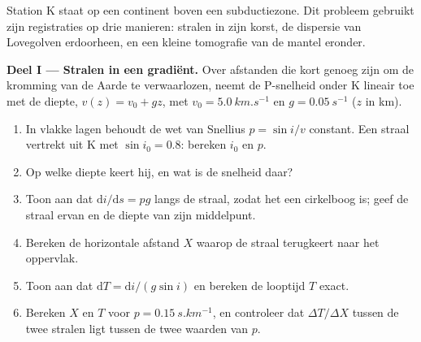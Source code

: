 \begin{problem}
\label{pb:b3:seismology-imaging:1}
Station K staat op een continent boven een subductiezone. Dit probleem gebruikt
zijn registraties op drie manieren: stralen in zijn korst, de dispersie van
Lovegolven erdoorheen, en een kleine tomografie van de mantel eronder.

\medskip
\noindent\textbf{Deel I --- Stralen in een gradiënt.} Over afstanden die kort
genoeg zijn om de kromming van de Aarde te verwaarlozen, neemt de P-snelheid onder
K lineair toe met de diepte, $v(z) = v_0 + gz$, met $v_0 = \qty{5.0}{km.s^{-1}}$ en
$g = \qty{0.05}{s^{-1}}$ ($z$ in km).
\begin{enumerate}
  \item In vlakke lagen behoudt de wet van Snellius $p = \sin i/v$ constant. Een
        straal vertrekt uit K met $\sin i_0 = 0.8$: bereken $i_0$ en $p$.
  \item Op welke diepte keert hij, en wat is de snelheid daar?
  \item Toon aan dat $\mathrm di/\mathrm ds = pg$ langs de straal, zodat het een
        cirkelboog is; geef de straal ervan en de diepte van zijn middelpunt.
  \item Bereken de horizontale afstand $X$ waarop de straal terugkeert naar het
        oppervlak.
  \item Toon aan dat $\mathrm dT = \mathrm di/(g\sin i)$ en bereken de looptijd
        $T$ exact.
  \item Bereken $X$ en $T$ voor $p = \qty{0.15}{s.km^{-1}}$, en controleer dat
        $\Delta T/\Delta X$ tussen de twee stralen ligt tussen de twee waarden
        van $p$.
\end{enumerate}


\end{problem}
